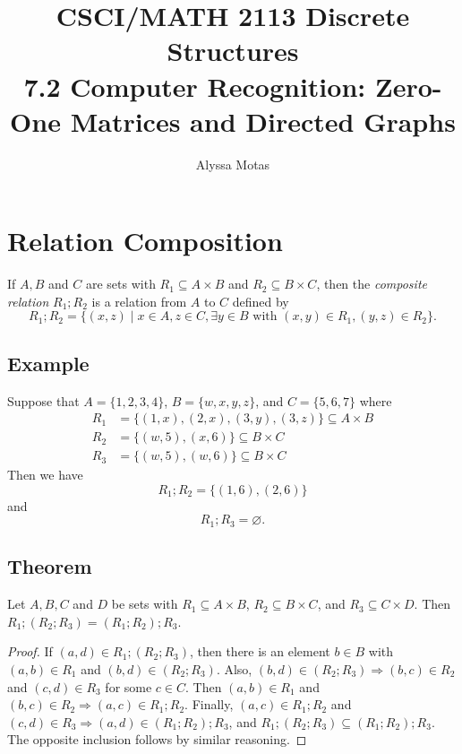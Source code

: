 \documentclass[11pt]{article}
\title{\textbf{CSCI/MATH 2113 Discrete Structures} \\ 7.2 Computer Recognition: Zero-One Matrices and Directed Graphs}
\author{Alyssa Motas}
\let\emptyset\varnothing
\begin{document}
    \maketitle

    \pagebreak

    \tableofcontents

    \pagebreak

    \section{Relation Composition}

    If \(A,B\) and $C$ are sets with \(R_1 \subseteq A \times B\) and \(R_2 \subseteq B \times C\), then the \emph{composite relation} \(R_1 ; R_2\) is a relation from $A$ to $C$ defined by \[R_1 ; R_2 = \{(x,z) \mid x \in A, z \in C, \exists y \in B \text{ with } (x,y) \in R_1, (y,z) \in R_2\}.\]

    \subsection{Example}

    Suppose that \(A = \{1,2,3,4\}\), \(B = \{w,x,y,z\}\), and \(C = \{5,6,7\}\) where
    \begin{align*}
        R_1 &= \{(1,x),(2,x),(3,y),(3,z)\} \subseteq A \times B \\
        R_2 &= \{(w,5),(x,6)\} \subseteq B \times C \\
        R_3 &= \{(w,5), (w,6)\} \subseteq B \times C
    \end{align*}
    Then we have \[R_1;R_2 = \{(1,6),(2,6)\}\] and \[R_1;R_3 = \emptyset.\]

    \subsection{Theorem}

    Let \(A,B,C\) and $D$ be sets with \(R_1 \subseteq A \times B\), \(R_2 \subseteq B \times C\), and \(R_3 \subseteq C \times D.\) Then \(R_1;(R_2;R_3) = (R_1;R_2);R_3.\)

    \begin{proof}
        If \((a,d) \in R_1;(R_2;R_3)\), then there is an element \(b \in B\) with \((a,b) \in R_1\) and \((b,d) \in (R_2;R_3)\). Also, \((b,d) \in (R_2;R_3) \Rightarrow (b,c) \in R_2\) and \((c,d) \in R_3\) for some \(c \in C\). Then \((a,b) \in R_1\) and \((b,c) \in R_2 \Rightarrow (a,c) \in R_1;R_2\). Finally, \((a,c) \in R_1;R_2\) and \((c,d) \in R_3 \Rightarrow (a,d) \in (R_1;R_2);R_3\), and \(R_1;(R_2;R_3) \subseteq (R_1;R_2);R_3\). The opposite inclusion follows by similar reasoning.
    \end{proof}
\end{document}

